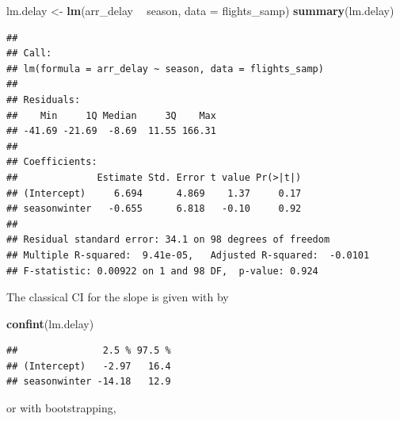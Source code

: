 \documentclass[]{book}
\newenvironment{Shaded}{\begin{snugshade}}{\end{snugshade}}
\newcommand{\CommentTok}[1]{\textcolor[rgb]{0.56,0.35,0.01}{\textit{#1}}}
\newcommand{\DataTypeTok}[1]{\textcolor[rgb]{0.13,0.29,0.53}{#1}}
\newcommand{\DecValTok}[1]{\textcolor[rgb]{0.00,0.00,0.81}{#1}}
\newcommand{\KeywordTok}[1]{\textcolor[rgb]{0.13,0.29,0.53}{\textbf{#1}}}
\newcommand{\NormalTok}[1]{#1}
\newcommand{\OperatorTok}[1]{\textcolor[rgb]{0.81,0.36,0.00}{\textbf{#1}}}
\newcommand{\OtherTok}[1]{\textcolor[rgb]{0.56,0.35,0.01}{#1}}
\newcommand{\StringTok}[1]{\textcolor[rgb]{0.31,0.60,0.02}{#1}}
\begin{document}
\begin{Shaded}
\begin{Highlighting}[]
\NormalTok{lm.delay <-}\StringTok{ }\KeywordTok{lm}\NormalTok{(arr_delay }\OperatorTok{~}\StringTok{ }\NormalTok{season, }\DataTypeTok{data =}\NormalTok{ flights_samp)}
\KeywordTok{summary}\NormalTok{(lm.delay)}
\end{Highlighting}
\end{Shaded}

\begin{verbatim}
## 
## Call:
## lm(formula = arr_delay ~ season, data = flights_samp)
## 
## Residuals:
##    Min     1Q Median     3Q    Max 
## -41.69 -21.69  -8.69  11.55 166.31 
## 
## Coefficients:
##              Estimate Std. Error t value Pr(>|t|)
## (Intercept)     6.694      4.869    1.37     0.17
## seasonwinter   -0.655      6.818   -0.10     0.92
## 
## Residual standard error: 34.1 on 98 degrees of freedom
## Multiple R-squared:  9.41e-05,   Adjusted R-squared:  -0.0101 
## F-statistic: 0.00922 on 1 and 98 DF,  p-value: 0.924
\end{verbatim}

The classical CI for the slope is given with by

\begin{Shaded}
\begin{Highlighting}[]
\KeywordTok{confint}\NormalTok{(lm.delay)}
\end{Highlighting}
\end{Shaded}

\begin{verbatim}
##               2.5 % 97.5 %
## (Intercept)   -2.97   16.4
## seasonwinter -14.18   12.9
\end{verbatim}

or with bootstrapping,

\begin{Shaded}
\end{Shaded}
\end{document}
